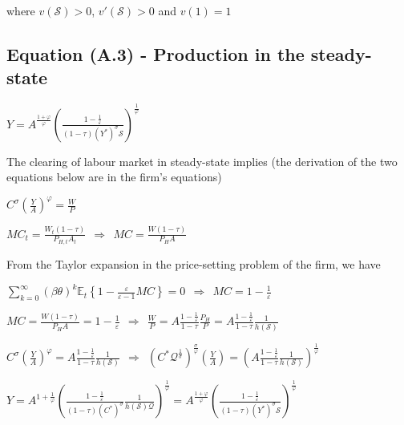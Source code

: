 \documentclass[
]{article}
\begin{document}
where \(v (\mathcal{S})>0\), \(v' (\mathcal{S})>0\) and \(v (1)=1\)

\vspace{12pt}

\hypertarget{equation-a.3---production-in-the-steady-state}{%
\subsection{Equation (A.3) - Production in the
steady-state}\label{equation-a.3---production-in-the-steady-state}}

\(\displaystyle Y= A^{\frac{1+\varphi}{\varphi}} \left( \frac{1-\frac{1}{\varepsilon}}{(1-\tau)(Y^*)^\sigma \mathcal{S}} \right)^\frac{1}{\varphi}\)

\vspace{8pt}

The clearing of labour market in steady-state implies (the derivation of
the two equations below are in the firm's equations)

\(\displaystyle C^\sigma \left( \frac{Y}{A} \right)^\varphi= \frac{W}{P}\)

\(\displaystyle MC_t = \frac{W_t(1-\tau)}{P_{H,t} A_t} \ \ \Rightarrow \ \  MC = \frac{W(1-\tau)}{P_{H} A}\)

From the Taylor expansion in the price-setting problem of the firm, we
have

\(\displaystyle \sum_{k=0}^\infty (\beta \theta)^k\mathbb{E}_t \left\{ 1-\frac{\varepsilon}{\varepsilon-1} MC \right\}=0 \ \ \Rightarrow \ \ MC=1-\frac{1}{\varepsilon}\)

\(\displaystyle MC = \frac{W(1-\tau)}{P_{H} A} = 1-\frac{1}{\varepsilon} \ \ \Rightarrow \ \ \frac{W}{P}=A \frac{1-\frac{1}{\varepsilon}}{1-\tau} \frac{P_H}{P}=A \frac{1-\frac{1}{\varepsilon}}{1-\tau} \frac{1}{h (\mathcal{S})}\)

\(\displaystyle C^\sigma \left( \frac{Y}{A} \right)^\varphi = A \frac{1-\frac{1}{\varepsilon}}{1-\tau} \frac{1}{h (\mathcal{S})} \ \ \Rightarrow \ \ \left( C^*\mathcal{Q}^\frac{1}{\sigma} \right)^\frac{\sigma}{\varphi} \left( \frac{Y}{A} \right) = \left(A \frac{1-\frac{1}{\varepsilon}}{1-\tau} \frac{1}{h (\mathcal{S})} \right)^\frac{1}{\varphi}\)

\(\displaystyle Y=A^{1+\frac{1}{\varphi}} \left( \frac{1-\frac{1}{\varepsilon}}{(1-\tau)(C^*)^\sigma} \frac{1}{ h (\mathcal{S})\mathcal{Q}} \right)^\frac{1}{\varphi} = A^{\frac{1+\varphi}{\varphi}} \left( \frac{1-\frac{1}{\varepsilon}}{(1-\tau)(Y^*)^\sigma \mathcal{S}} \right)^\frac{1}{\varphi}\)
\end{document}
